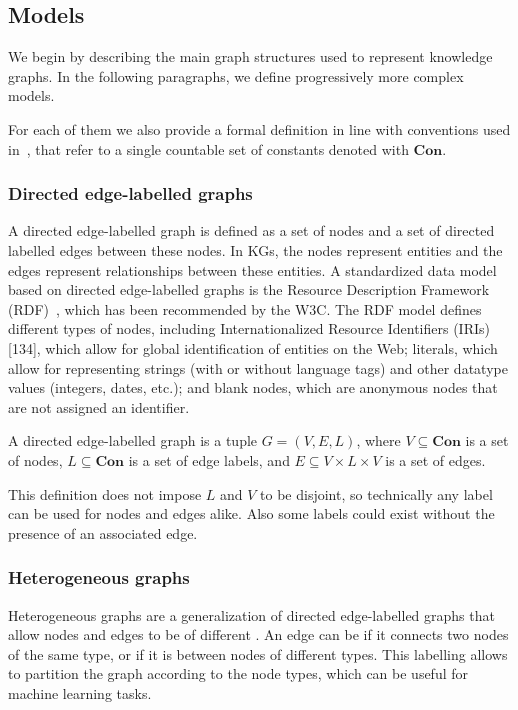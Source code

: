 \subsection{Models}\label{models}
We begin by describing the main graph structures used to represent knowledge graphs. In the following paragraphs, we define progressively more complex models. 

\medskip
For each of them we also provide a formal definition in line with conventions used in~\cite{Angles2017FoundationmodernQueryLnguagesforGraphDatabases}, that refer to a single countable set of constants denoted with $\textbf{Con}$.

\subsubsection{Directed edge-labelled graphs}
A directed edge-labelled graph is defined as a set of nodes and a set of directed labelled edges between these nodes. In KGs, the nodes represent entities and the edges represent relationships between these entities. A standardized data model based on directed edge-labelled graphs is the Resource Description Framework (RDF)~\cite{Cyganiak2014rdf}, which has been recommended by the W3C. The RDF model defines different types of nodes, including Internationalized Resource Identifiers (IRIs) [134], which allow for global identification of entities on the Web; literals, which allow for representing strings (with or without language tags) and other datatype values (integers, dates, etc.); and blank nodes, which are anonymous nodes that are not assigned an identifier.

\begin{definition}\label{def:directed-edge-labelled-graph}
A directed edge-labelled graph is a tuple $G = (V, E, L)$, where $V \subseteq \textbf{Con}$ is a set of nodes, $L \subseteq \textbf{Con}$ is a set of edge labels, and $E \subseteq V \times L \times V$ is a set of edges.
\end{definition}
This definition does not impose $L$ and $V$ to be disjoint, so technically any label can be used for nodes and edges alike. Also some labels could exist without the presence of an associated edge.

\subsubsection{Heterogeneous graphs}
Heterogeneous graphs are a generalization of directed edge-labelled graphs that allow nodes and edges to be of different . An edge can be  if it connects two nodes of the same type, or  if it is between nodes of different types. This labelling allows to partition the graph according to the node types, which can be useful for machine learning tasks.

